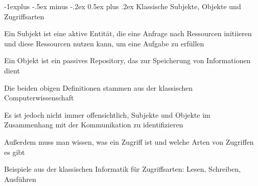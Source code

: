 \documentclass[a4paper]{article}
\makeatletter
\renewcommand{\subsection}{\@startsection{subsection}{2}{0mm}%
 {-1explus -.5ex minus -.2ex}%
 {0.5ex plus .2ex}%
 {\normalfont\normalsize\bfseries}}
\makeatother
\begin{document}
\begin{multicols}{3}
      \subsection{Klassische Subjekte, Objekte und Zugriffsarten}
      \begin{itemize*}
            \item Ein Subjekt ist eine aktive Entität, die eine Anfrage nach Ressourcen initiieren und diese Ressourcen nutzen kann, um eine Aufgabe zu erfüllen
            \item Ein Objekt ist ein passives Repository, das zur Speicherung von Informationen dient
            \item Die beiden obigen Definitionen stammen aus der klassischen Computerwissenschaft
            \item Es ist jedoch nicht immer offensichtlich, Subjekte und Objekte im Zusammenhang mit der Kommunikation zu identifizieren
            \item Außerdem muss man wissen, was ein Zugriff ist und welche Arten von Zugriffen es gibt
            \item Beispiele aus der klassischen Informatik für Zugriffsarten: Lesen, Schreiben, Ausführen
      \end{itemize*}


\end{multicols}
\end{document}
